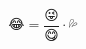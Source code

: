 \documentclass[a5paper,11pt]{article}
\begin{document}
\begin{equation*}
	😂 = \dfrac{😜}{😋} \cdot 💦
\end{equation*}
\end{document}
